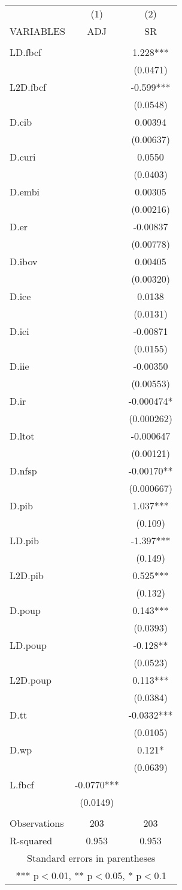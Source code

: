 \begin{tabular}{lcc} \hline
 & (1) & (2) \\
VARIABLES & ADJ & SR \\ \hline
 &  &  \\
LD.fbcf &  & 1.228*** \\
 &  & (0.0471) \\
L2D.fbcf &  & -0.599*** \\
 &  & (0.0548) \\
D.cib &  & 0.00394 \\
 &  & (0.00637) \\
D.curi &  & 0.0550 \\
 &  & (0.0403) \\
D.embi &  & 0.00305 \\
 &  & (0.00216) \\
D.er &  & -0.00837 \\
 &  & (0.00778) \\
D.ibov &  & 0.00405 \\
 &  & (0.00320) \\
D.ice &  & 0.0138 \\
 &  & (0.0131) \\
D.ici &  & -0.00871 \\
 &  & (0.0155) \\
D.iie &  & -0.00350 \\
 &  & (0.00553) \\
D.ir &  & -0.000474* \\
 &  & (0.000262) \\
D.ltot &  & -0.000647 \\
 &  & (0.00121) \\
D.nfsp &  & -0.00170** \\
 &  & (0.000667) \\
D.pib &  & 1.037*** \\
 &  & (0.109) \\
LD.pib &  & -1.397*** \\
 &  & (0.149) \\
L2D.pib &  & 0.525*** \\
 &  & (0.132) \\
D.poup &  & 0.143*** \\
 &  & (0.0393) \\
LD.poup &  & -0.128** \\
 &  & (0.0523) \\
L2D.poup &  & 0.113*** \\
 &  & (0.0384) \\
D.tt &  & -0.0332*** \\
 &  & (0.0105) \\
D.wp &  & 0.121* \\
 &  & (0.0639) \\
L.fbcf & -0.0770*** &  \\
 & (0.0149) &  \\
 &  &  \\
Observations & 203 & 203 \\
 R-squared & 0.953 & 0.953 \\ \hline
\multicolumn{3}{c}{ Standard errors in parentheses} \\
\multicolumn{3}{c}{ *** p$<$0.01, ** p$<$0.05, * p$<$0.1} \\
\end{tabular}
